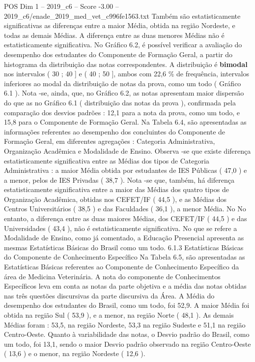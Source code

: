 \begin{textsample}{POS Dim 1 – 2019\_c6 – Score -3.00 – 2019\_c6/enade\_2019\_med\_vet\_c996fe1563.txt}
Também são estatisticamente significativas as diferenças entre a maior Média, obtida na região Nordeste, e todas as demais Médias.
A diferença entre as duas menores Médias não é estatisticamente significativa.
No Gráfico 6.2, é possível verificar a avaliação do desempenho dos estudantes do Componente de Formação Geral, a partir do histograma da distribuição das notas correspondentes.
A distribuição é \textbf{bimodal} nos intervalos ( 30 ; 40 ] e ( 40 ; 50 ], ambos com 22,6 \% de frequência, intervalos inferiores ao modal da distribuição de notas da prova, como um todo ( Gráfico 6.1 ).
Nota -se, ainda, que, no Gráfico 6.2, as notas apresentam maior dispersão do que as no Gráfico 6.1 ( distribuição das notas da prova ), confirmada pela comparação dos desvios padrões : 12,1 para a nota da prova, como um todo, e 15,8 para o Componente de Formação Geral.
Na Tabela 6.4, são apresentadas as informações referentes ao desempenho dos concluintes do Componente de Formação Geral, em diferentes agregações : Categoria Administrativa, Organização Acadêmica e Modalidade de Ensino.
Observa -se que existe diferença estatisticamente significativa entre as Médias dos tipos de Categoria Administrativa : a maior Média obtida por estudantes de IES Públicas ( 47,0 ) e a menor, pelos de IES Privadas ( 38,7 ).
Nota -se que, também, há diferença estatisticamente significativa entre a maior das Médias dos quatro tipos de Organização Acadêmica, obtidas nos CEFET/IF ( 44,5 ), e as Médias dos Centros Universitários ( 38,5 ) e das Faculdades ( 36,1 ), a menor Média.
No No entanto, a diferença entre as duas maiores Médias, dos CEFET/IF ( 44,5 ) e das Universidades ( 43,4 ), não é estatisticamente significativa.
No que se refere a Modalidade de Ensino, como já comentado, a Educação Presencial apresenta as mesmas Estatísticas Básicas do Brasil como um todo. 6.1.3 Estatísticas Básicas do Componente de Conhecimento Específico Na Tabela 6.5, são apresentadas as Estatísticas Básicas referentes ao Componente de Conhecimento Específico da área de Medicina Veterinária.
A nota do componente de Conhecimentos Específicos leva em conta as notas da parte objetiva e a média das notas obtidas nas três questões discursivas da parte discursiva da Área.
A Média do desempenho dos estudantes do Brasil, como um todo, foi 52,9.
A maior Média foi obtida na região Sul ( 53,9 ), e a menor, na região Norte ( 48,1 ).
As demais Médias foram : 53,5, na região Nordeste, 53,3 na região Sudeste e 51,1 na região Centro-Oeste.
Quanto à variabilidade das notas, o Desvio padrão do Brasil, como um todo, foi 13,1, sendo o maior Desvio padrão observado na região Centro-Oeste ( 13,6 ) e o menor, na região Nordeste ( 12,6 ).

\end{textsample}
